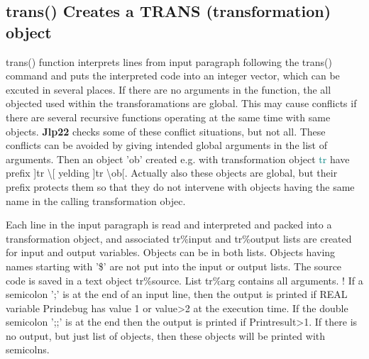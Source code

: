 \subsection{\textcolor{VioletRed}{trans}() Creates a TRANS (transformation) object}
\label{trans}
\textcolor{VioletRed}{trans}() function interprets lines from input paragraph following the \textcolor{VioletRed}{trans}() command and puts the
interpreted code into an integer vector, which can be excuted in several places.
If there are no arguments in the function, the all objected used within the
transforamations are global. This may cause conflicts if there are several recursive
functions operating at the same time with same objects. \textbf{Jlp22} checks some of
these conflict situations, but not all.  These conflicts can be avoided by giving
intended global arguments  in the list of arguments.
Then an object 'ob' created e.g. with transformation object \textcolor{teal}{tr} have prefix
]tr \textbackslash [ yelding ]tr \textbackslash ob[. Actually also these objects are global, but their prefix
protects them so that they do not intervene with objects having the same name in the
calling transformation objec.

Each line in the input paragraph is read and interpreted and packed into a transformation
object, and associated tr\%input and tr\%output lists are created for input and output
variables. Objects can be in both lists. Objects having names starting
with '\$' are not put into the input or output lists. The source code is saved in a text object
tr\%source. List tr\%arg contains all arguments.
	!
If a semicolon ';'  is at the end of an input line, then
the output is printed if REAL variable Prindebug has value 1 or value>2 at
the execution time. If the double semicolon ';;' is at the end then the output is
printed if Printresult>1. If there is no output, but just list of objects, then these
objects will be printed with semicolns.

